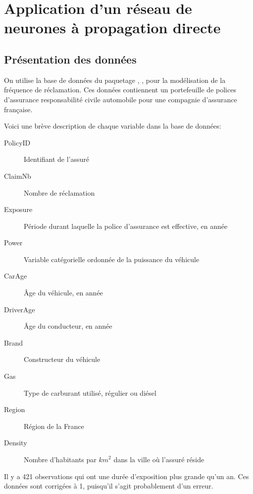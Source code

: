 \chapter{Application d'un réseau de neurones à propagation directe}     %
\label{chap:Application}                   

\section{Présentation des données}
\label{sec:app:donnees}

On utilise la base de données  \verb@freMTPLfreq@ du paquetage \verb@CASdatasets@, \citep{cas}, pour la modélisation de la fréquence de réclamation. Ces données contiennent un portefeuille de  polices d'assurance responsabilité civile automobile pour une compagnie d'assurance française.

Voici une brève description de chaque variable dans la base de données:
\begin{description}
\item[PolicyID] Identifiant de l'assuré \\
\item[ClaimNb]  Nombre de réclamation\\
\item[Exposure] Période durant laquelle la police d'assurance est effective, en année\\
\item[Power] Variable catégorielle ordonnée de la puissance du véhicule\\
\item[CarAge] Âge du véhicule, en année \\
\item[DriverAge] Âge du conducteur, en année\\
\item[Brand] Constructeur du véhicule  \\
\item[Gas] Type de carburant utilisé, régulier ou diésel\\
\item[Region] Région de la France\\
\item[Density] Nombre d'habitants par ${km}^2$ dans la ville où l'assuré réside \\
\end{description}

Il y a 421 observations qui ont une durée d'exposition plus grande qu'un an. Ces données sont corrigées à 1, puisqu'il s'agit probablement d'un erreur. 

